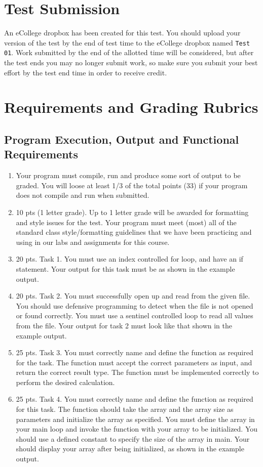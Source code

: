 \documentclass[11pt]{article}
\begin{document}
\section*{Test Submission}
\label{sec-3}


An eCollege dropbox has been created for this test.  You should upload
your version of the test by the end of test time to the eCollege
dropbox named \verb~Test 01~.  Work submitted by the end of the allotted
time will be considered, but after the test ends you may no longer
submit work, so make sure you submit your best effort by the test end
time in order to receive credit.
\section*{Requirements and Grading Rubrics}
\label{sec-4}
\subsection*{Program Execution, Output and Functional Requirements}
\label{sec-4-1}


\begin{enumerate}
\item Your program must compile, run and produce some sort of output to
   be graded. You will loose at least 1/3 of the total points (33) if
   your program does not compile and run when submitted.
\item 10 pts (1 letter grade).  Up to 1 letter grade will be awarded for
   formatting and style issues for the test.  Your program must meet
   (most) all of the standard class style/formatting guidelines that
   we have been practicing and using in our labs and assignments for
   this course.
\item 20 pts. Task 1.  You must use an index controlled for loop, and
   have an if statement.  Your output for this task must be as
   shown in the example output.
\item 20 pts.  Task 2.  You must successfully open up and read from the
   given file.  You should use defensive programming to detect when
   the file is not opened or found correctly.  You must use a sentinel
   controlled loop to read all values from the file.  Your output
   for task 2 must look like that shown in the example output.
\item 25 pts. Task 3.  You must correctly name and define the function as
   required for the task.  The function must accept the correct
   parameters as input, and return the correct result type.  The
   function must be implemented correctly to perform the desired
   calculation.
\item 25 pts.  Task 4. You must correctly name and define the function as
   required for this task.  The function should take the array and the
   array size as parameters and initialize the array as specified.
   You must define the array in your main loop and invoke the function
   with your array to be initialized.  You should use a defined
   constant to specify the size of the array in main.  Your should
   display your array after being initialized, as shown in the example
   output.
\end{enumerate}
\end{document}
